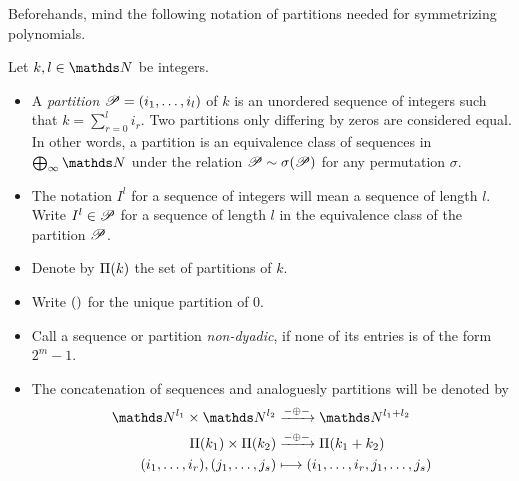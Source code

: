 Beforehands, mind the following notation of partitions needed for
symmetrizing polynomials.
\begin{Def}\label{def:partition}
  Let $k,l\in\Nat$ be integers.
  \begin{itemize}
  \item
    A \emph{partition} $\mathscr{P}=(i_1,\dotsc,i_l)$ of $k$ is an unordered sequence
    of integers such that $k=\sum_{r=0}^{l}i_r$.
    Two partitions only differing by zeros are considered equal.
    In other words, a partition is an equivalence class of sequences in
    $\bigoplus_\infty\Nat$ under the relation $\mathscr{P}\sim\sigma(\mathscr{P})$
    for any permutation $\sigma$.
  \item
    The notation $I^l$ for a sequence of integers will mean a sequence
    of length $l$. Write $I^l\in\mathscr{P}$ for a sequence of length
    $l$ in the equivalence class of the partition $\mathscr{P}$. 
  \item
    Denote by $\Pi({k})$ the set of partitions of $k$.
  \item
    Write $()$ for the unique partition of $0$.
  \item
    Call a sequence or partition \emph{non-dyadic}, if
    none of its entries is of the form $2^m-1$.
  \item The concatenation of sequences and analoguesly partitions will
    be denoted by
    \begin{align*}
      \Nat^{l_1} \times \Nat^{l_2}
      &\xrightarrow{-\concat-}
        \Nat^{l_1+l_2}
      \\
      \PartitionsOf{k_1} \times \PartitionsOf{k_2}
      &\xrightarrow{-\concat-}
        \PartitionsOf{k_1+k_2}
      \\
      (i_1,\dotsc,i_r), (j_1,\dotsc,j_s)
      &\longmapsto
        (i_1,\dotsc,i_r,j_1,\dotsc,j_s)
    \end{align*}
  \end{itemize}
\end{Def}

